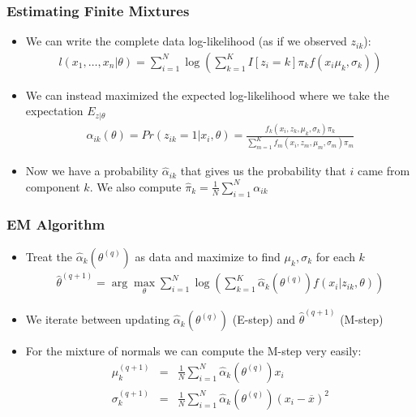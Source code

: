 \documentclass[aspectratio=169]{beamer}
\begin{document}
\begin{frame}
\frametitle{Estimating Finite Mixtures}
\begin{itemize}
\item We can write the complete data log-likelihood (as if we observed $z_{ik}$):
\begin{eqnarray*}
l(x_1,\ldots,x_n | \theta) = \sum_{i=1}^N  \log \left( \sum_{k=1}^K I[z_i = k]  \pi_k f(x_i \mu_k, \sigma_k) \right)
\end{eqnarray*}
\item We can instead maximized the expected log-likelihood where we take the expectation $E_{z|\theta}$
\begin{eqnarray*}
\alpha_{ik}(\theta) = Pr(z_{ik} =1 | x_i,\theta) = \frac{f_k(x_i,z_k,\mu_k,\sigma_k) \pi_k }{\sum_{m=1}^K f_m(x_i,z_m,\mu_m,\sigma_m) \pi_m}
\end{eqnarray*}
\item Now we have a probability $\hat{\alpha}_{ik}$ that gives us the probability that $i$ came from component $k$. We also compute $\hat{\pi}_k = \frac{1}{N} \sum_{i=1}^N \alpha_{ik}$
\end{itemize}
\end{frame}

\begin{frame}
\frametitle{EM Algorithm}
\begin{itemize}
\item Treat the $\hat{\alpha}_k(\theta^{(q)})$ as data and maximize to find $\mu_k,\sigma_k$ for each $k$
\begin{eqnarray*}
\hat{\theta}^{(q+1)} = \arg \max_{\theta}  \sum_{i=1}^N  \log \left( \sum_{k=1}^K \hat{\alpha}_k(\theta^{(q)}) f(x_i | z_{ik}, \theta ) \right)
\end{eqnarray*}
\item We iterate between updating $\hat{\alpha}_k(\theta^{(q)})$ (E-step) and $\hat{\theta}^{(q+1)}$ (M-step)
\item For the mixture of normals we can compute the M-step very easily:
\begin{eqnarray*}
\mu_k^{(q+1)} &=& \frac{1}{N} \sum_{i=1}^N \hat{\alpha}_k(\theta^{(q)}) x_{i}\\
\sigma_k^{(q+1)} &=& \frac{1}{N} \sum_{i=1}^N \hat{\alpha}_k(\theta^{(q)}) (x_{i} - \overline{x})^2 \\
\end{eqnarray*}
\end{itemize}
\end{frame}
\end{document}
